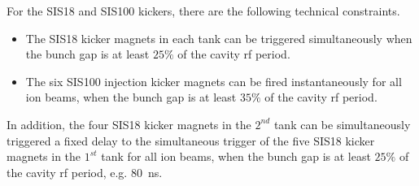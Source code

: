 For the SIS18 and SIS100 kickers, there are the following technical constraints.
\begin{itemize}
	\item The SIS18 kicker magnets in each tank can be triggered simultaneously when the bunch gap is at least $25\%$ of the cavity rf period. 

	\item The six SIS100 injection kicker magnets can be fired instantaneously for all ion beams, when the bunch gap is at least $35\%$ of the cavity rf period.
\end{itemize}

In addition, the four SIS18 kicker magnets in the $2^{nd}$ tank can be simultaneously triggered a fixed delay to the simultaneous trigger of the five SIS18 kicker magnets in the $1^{st}$ tank for all ion beams, when the bunch gap is at least $25\%$ of the cavity rf period, e.g. \SI{80}{\ns}.